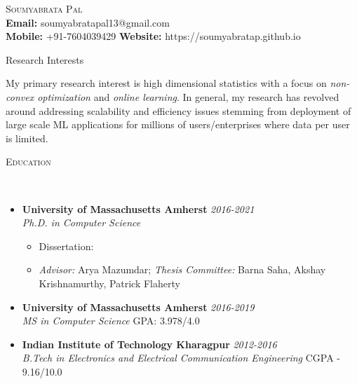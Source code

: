 \documentclass[9pt]{article}
\newenvironment{changemargin}[2]{%
  \begin{list}{}{%
    \setlength{\topsep}{0pt}%
    \setlength{\leftmargin}{0pt}%
    \setlength{\rightmargin}{#2}%
    \setlength{\listparindent}{\parindent}%
    \setlength{\itemindent}{\parindent}%
    \setlength{\parsep}{\parskip}%
  }%
  \item[]}{\end{list}
}
\newcommand{\lineover}{
	\begin{changemargin}{-0.05in}{-0.05in}
		\vspace*{-8pt}
		\hrulefill \\
		\vspace*{-2pt}
	\end{changemargin}
}
\newcommand{\header}[1]{
	\begin{changemargin}{-0.5in}{-0.5in}
		\scshape{#1}\\
  	\lineover
	\end{changemargin}
}
\newcommand{\contact}[4]{
	\begin{changemargin}{-0.5in}{-0.5in}
		\begin{center}
			{\Large \scshape {#1}}\\ \smallskip
			{#2}\\ \smallskip 
			{#3}\\ \smallskip
			{#4}\smallskip
		\end{center}
	\end{changemargin}
}
\newenvironment{body} {
	\vspace*{-16pt}
	\begin{changemargin}{-0.25in}{-0.5in}
  }	
	{\end{changemargin}
}
\begin{document}
\contact{Soumyabrata Pal}{\textbf{Email:} soumyabratapal13@gmail.com}{\textbf{Mobile:} +91-7604039429 \hspace{6mm} \textbf{Website:} https://soumyabratap.github.io}


\header{Research Interests}

\begin{body}
\vspace{14pt}
My primary research interest is high dimensional statistics with a focus on \textit{non-convex optimization} and \textit{online learning}. In general,
my research has revolved around addressing scalability and efficiency issues stemming from deployment of large scale ML applications for millions of users/enterprises where data per user is limited.

\end{body}

\smallskip
\header{Education}

\begin{body}
	\vspace{14pt}
	\begin{itemize}
	\item \textbf{University of Massachusetts Amherst} \hfill \emph{ 2016-2021}\\ 
	\emph{Ph.D. in Computer Science}\\
	\begin{itemize}
	\item Dissertation: \href{https://web.cs.umass.edu/publication/docs/2022/UM-CS-PhD-2022-001.pdf}{}
	\item \textit{Advisor:} Arya Mazumdar; \textit{Thesis Committee:} Barna Saha, Akshay Krishnamurthy, Patrick Flaherty
	\end{itemize}
  \item \textbf{University of Massachusetts Amherst} \hfill \emph{ 2016-2019}\\ 
	\emph{MS in Computer Science} \hfill GPA: 3.978/4.0\\	
	
\item \textbf{Indian Institute of Technology Kharagpur } \hfill \emph{2012-2016} \\
	\emph{B.Tech in Electronics and Electrical Communication Engineering} \hfill CGPA - 9.16/10.0 \\
\end{itemize}
\end{body}
\end{document}
